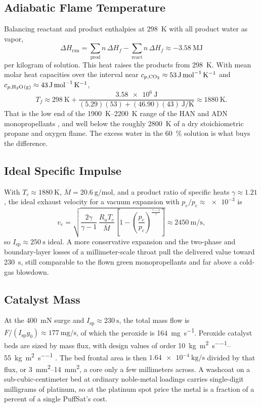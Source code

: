 \documentclass{article}
\begin{document}
\subsection*{Adiabatic Flame Temperature}
Balancing reactant and product enthalpies at \SI{298}{\kelvin} with all product water as vapor,
\[
\Delta H_\mathrm{rxn} = \sum_\mathrm{prod}\! n\,\Delta H_f - \sum_\mathrm{react}\! n\,\Delta H_f \approx \SI{-3.58}{\mega\joule}
\]
per kilogram of solution. This heat raises the products from \SI{298}{\kelvin}. With mean molar heat capacities over the interval near \(c_{p,\ce{CO2}}\approx\SI{53}{\joule\per\mole\per\kelvin}\) and \(c_{p,\ce{H2O(g)}}\approx\SI{43}{\joule\per\mole\per\kelvin}\),
\[
T_f \approx \SI{298}{\kelvin} + \frac{\SI{3.58e6}{\joule}}{(5.29)(53) + (46.90)(43)\ \si{\joule\per\kelvin}} \approx \SI{1880}{\kelvin}.
\]
That is the low end of the \SIrange{1900}{2200}{\kelvin} range of the HAN and ADN monopropellants \cite{green_monoprop_review}, and well below the roughly \SI{2800}{\kelvin} of a dry stoichiometric propane and oxygen flame. The excess water in the \SI{60}{\percent} solution is what buys the difference.

\subsection*{Ideal Specific Impulse}
With \(T_c \approx \SI{1880}{\kelvin}\), \(\overline{M} = \SI{20.6}{\g\per\mole}\), and a product ratio of specific heats \(\gamma \approx 1.21\), the ideal exhaust velocity for a vacuum expansion with \(p_e/p_c \approx \num{e-3}\) is
\[
v_e = \sqrt{\frac{2\gamma}{\gamma-1}\,\frac{R_u T_c}{\overline{M}}\left[1-\left(\frac{p_e}{p_c}\right)^{\!\frac{\gamma-1}{\gamma}}\right]} \approx \SI{2450}{\meter\per\second},
\]
so \(I_\mathrm{sp} \approx \SI{250}{\second}\) ideal. A more conservative expansion and the two-phase and boundary-layer losses of a millimeter-scale throat pull the delivered value toward \SI{230}{\second}, still comparable to the flown green monopropellants and far above a cold-gas blowdown.

\subsection*{Catalyst Mass}
At the \SI{400}{\milli\newton} surge and \(I_\mathrm{sp} \approx \SI{230}{\second}\), the total mass flow is \(F/(I_\mathrm{sp} g_0) \approx \SI{177}{\milli\gram\per\second}\), of which the peroxide is \SI{164}{\milli\gram\per\second}. Peroxide catalyst beds are sized by mass flux, with design values of order \SIrange{10}{55}{\kilo\gram\per\square\meter\per\second} \cite{jung2021catalyst_bed_scaling}. The bed frontal area is then \(\SI{1.64e-4}{\kilo\gram\per\second}\) divided by that flux, or \SIrange{3}{14}{\square\milli\meter}, a core only a few millimeters across. A washcoat on a sub-cubic-centimeter bed at ordinary noble-metal loadings carries single-digit milligrams of platinum, so at the platinum spot price the metal is a fraction of a percent of a single PuffSat's cost.
\end{document}

